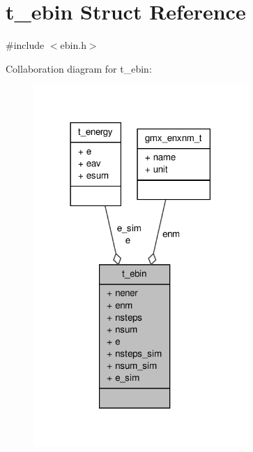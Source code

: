 \hypertarget{structt__ebin}{\section{t\-\_\-ebin \-Struct \-Reference}
\label{structt__ebin}
}


{\ttfamily \#include $<$ebin.\-h$>$}



\-Collaboration diagram for t\-\_\-ebin\-:
\nopagebreak
\begin{figure}[H]
\begin{center}
\leavevmode
\includegraphics[width=230pt]{structt__ebin__coll__graph}
\end{center}
\end{figure}
